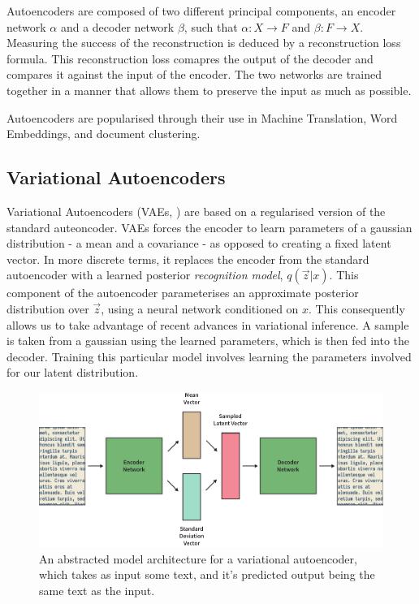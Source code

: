\documentclass[12pt,twoside]{report}
\begin{document}
Autoencoders are composed of two different principal components, an encoder network $\alpha$ and a decoder network $\beta$, such that $\alpha : X \rightarrow F$ and $\beta : F \rightarrow X$. Measuring the success of the reconstruction is deduced by a reconstruction loss formula. This reconstruction loss comapres the output of the decoder and compares it against the input of the encoder. The two networks are trained together in a manner that allows them to preserve the input as much as possible.


Autoencoders are popularised through their use in Machine Translation, Word Embeddings, and document clustering. 

\subsection{Variational Autoencoders}

Variational Autoencoders (VAEs, \cite{kingma_auto-encoding_2013}) are based on a regularised version of the standard auteoncoder. VAEs forces the encoder to learn parameters of a gaussian distribution - a mean and a covariance - as opposed to creating a fixed latent vector. In more discrete terms, it replaces the encoder from the standard autoencoder with a learned posterior \textit{recognition model}, $q(\overrightarrow{z}|x)$. This component of the autoencoder parameterises an approximate posterior distribution over $\overrightarrow{z}$, using a neural network conditioned on $x$. This consequently allows us to take advantage of recent advances in variational inference.  A sample is taken from a gaussian using the learned parameters, which is then fed into the decoder. Training this particular model involves learning the parameters involved for our latent distribution.

\begin{figure}[!ht]
	\centering
	\includegraphics[width=150mm]{diagrams/variational_autoencoders.pdf}
	\caption{An abstracted model architecture for a variational autoencoder, which takes as input some text, and it's predicted output being the same text as the input.\label{vae}}
  \end{figure}
\end{document}
